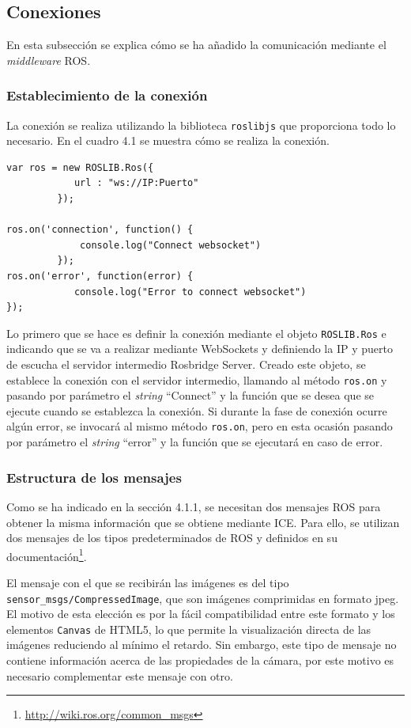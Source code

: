 \subsection{Conexiones}

En esta subsección se explica cómo se ha añadido la comunicación mediante el \textit{middleware} ROS.

\subsubsection{Establecimiento de la conexión}

La conexión se realiza utilizando la biblioteca \texttt{roslibjs} que proporciona todo lo necesario. En el cuadro 4.1 se muestra cómo se realiza la conexión.

\begin{lstlisting}[caption= Establecimiento de la conexión ROS, label=cod.conexioncamviz]
var ros = new ROSLIB.Ros({
            url : "ws://IP:Puerto"
         });

ros.on('connection', function() {
             console.log("Connect websocket")
         });
ros.on('error', function(error) {
            console.log("Error to connect websocket")
});
\end{lstlisting}

Lo primero que se hace es definir la conexión mediante el objeto \texttt{ROSLIB.Ros} e indicando que se va a realizar mediante WebSockets y definiendo la IP y puerto de escucha el servidor intermedio Rosbridge Server. Creado este objeto, se establece la conexión con el servidor intermedio, llamando al método \texttt{ros.on} y pasando por parámetro el \textit{string} ``Connect'' y la función que se desea que se ejecute cuando se establezca la conexión. Si durante la fase de conexión ocurre algún error, se invocará al mismo método \texttt{ros.on}, pero en esta ocasión pasando por parámetro el \textit{string} ``error'' y la función que se ejecutará en caso de error.

\subsubsection{Estructura de los mensajes}
Como se ha indicado en la sección 4.1.1, se necesitan dos mensajes ROS para obtener la misma información que se obtiene mediante ICE. Para ello, se utilizan dos mensajes de los tipos predeterminados de ROS y definidos en su documentación\footnote{\url{http://wiki.ros.org/common_msgs}}.

El mensaje con el que se recibirán las imágenes es del tipo \texttt{sensor\_msgs/CompressedImage}, que son imágenes comprimidas en formato jpeg. El motivo de esta elección es por la fácil compatibilidad entre este formato y los elementos \texttt{Canvas} de HTML5, lo que permite la visualización directa de las imágenes reduciendo al mínimo el retardo. Sin embargo, este tipo de mensaje no contiene información acerca de las propiedades de la cámara, por este motivo es necesario complementar este mensaje con otro.

